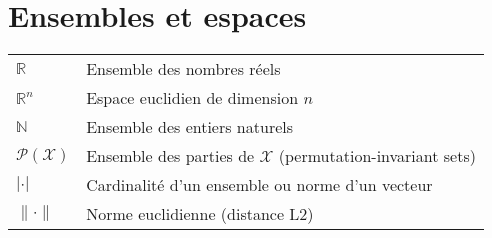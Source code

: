 \section*{Ensembles et espaces}

\begin{tabular}{p{2.5cm} p{11cm}}
  \hline
  $\mathbb{R}$ & Ensemble des nombres réels\\
  $\mathbb{R}^n$ & Espace euclidien de dimension $n$\\
  $\mathbb{N}$ & Ensemble des entiers naturels\\
  $\mathcal{P}(\mathcal{X})$ & Ensemble des parties de $\mathcal{X}$ (permutation-invariant sets)\\
  $|\cdot|$ & Cardinalité d'un ensemble ou norme d'un vecteur\\
  $\|\cdot\|$ & Norme euclidienne (distance L2)\\
  \hline
\end{tabular}
